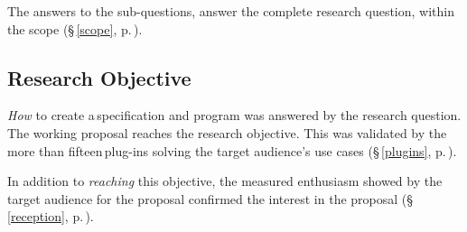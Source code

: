 The answers to the sub-questions, answer the complete research question,
  within the scope (§\,\ref{scope}, p.\,\pageref{scope}).

\subsection{Research Objective}\label{q-research-objective}

\emph{How} to create a\,specification and program was answered by the research
  question.
The working proposal reaches the research objective.
This was validated by the more than fifteen\,plug-ins solving the target
  audience's use cases (§\,\ref{plugins}, p.\,\pageref{plugins}).

In addition to \emph{reaching} this objective, the measured enthusiasm
  showed by the target audience for the proposal confirmed the interest in
  the proposal (§\,\ref{reception}, p.\,\pageref{reception}).
